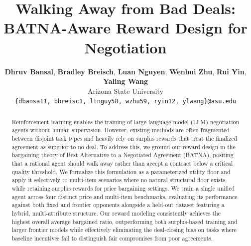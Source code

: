 \documentclass[11pt]{article}
\title{Walking Away from Bad Deals: BATNA-Aware Reward Design for Negotiation}
\author{
  \textbf{Dhruv Bansal},
  \textbf{Bradley Breisch},
  \textbf{Luan Nguyen},
  \textbf{Wenhui Zhu},
  \textbf{Rui Yin},
  \textbf{Yaling Wang}
\\
  Arizona State University \\
  \small{
    \texttt{\{dbansa11, bbreisc1, ltnguy58, wzhu59, ryin12, ylwang\}@asu.edu}
  }
}
\begin{document}
\maketitle
\raggedbottom


\begin{abstract}
Reinforcement learning enables the training of large language model (LLM) negotiation agents without human supervision. However, existing methods are often fragmented between disjoint task types and heavily rely on surplus rewards that treat the finalized agreement as superior to no deal. To address this, we ground our reward design in the bargaining theory of Best Alternative to a Negotiated Agreement (BATNA), positing that a rational agent should walk away rather than accept a contract below a critical quality threshold. We formalize this formulation as a parameterized utility floor and apply it selectively to multi-item scenarios where no natural structural floor exists, while retaining surplus rewards for price bargaining settings. We train a single unified agent across four distinct price and multi-item benchmarks, evaluating its performance against both fixed and frontier opponents alongside a held-out dataset featuring a hybrid, multi-attribute structure. Our reward modeling consistently achieves the highest overall average bargained ratio, outperforming both surplus-based training and larger frontier models while effectively eliminating the deal-closing bias on tasks where baseline incentives fail to distinguish fair compromises from poor agreements.
\end{abstract}
\end{document}
